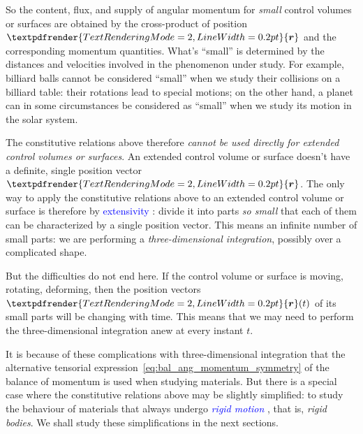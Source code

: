 \documentclass[a4paper,12pt,%
onecolumn,oneside,%
british%
]{memoir}
\renewcommand*{\bm}[1]{\textpdfrender{TextRenderingMode=2,LineWidth=0.2pt}{\boldsymbol{#1}}}
\renewcommand*{\|}[1][]{\nonscript\:#1\vert\nonscript\:\mathopen{}}
\newcommand*{\sect}{\S}%
\renewcommand*{\autoref}[3][\sect\,\ref]{\textcolor{blue}{#3}
\raisebox{0.6ex}{\color{blue}\miniscule%
\faIcon{angle-right}%
\;#1{#2}\;p.\,\pageref{#2}}}
\newcommand*{\yr}{\bm{r}}
\begin{document}
\medskip

So the content, flux, and supply of angular momentum for \emph{small} control volumes or surfaces are obtained by the cross-product of position $\yr$ and the corresponding momentum quantities. What's \enquote{small} is determined by the distances and velocities involved in the phenomenon under study. For example, billiard balls cannot be considered \enquote{small} when we study their collisions on a billiard table: their rotations lead to special motions; on the other hand, a planet can in some circumstances be considered as \enquote{small} when we study its motion in the solar system.

The constitutive relations above therefore \emph{cannot be used directly for extended control volumes or surfaces}. An extended control volume or surface doesn't have a definite, single position vector $\yr$. The only way to apply the constitutive relations above to an extended control volume or surface is therefore by \autoref{def:extensivity}{extensivity}: divide it into parts \emph{so small} that each of them can be characterized by a single position vector. This means an infinite number of small parts: we are performing a \emph{three-dimensional integration}, possibly over a complicated shape.

But the difficulties do not end here. If the control volume or surface is moving, rotating, deforming, then the position vectors $\yr(t)$ of its small parts will be changing with time. This means that we may need to perform the three-dimensional integration anew at every instant $t$.

It is because of these complications with three-dimensional integration that the alternative tensorial expression~\eqref{eq:bal_ang_momentum_symmetry} of the balance of momentum is used when studying materials. But there is a special case where the constitutive relations above may be slightly simplified: to study the behaviour of materials that always undergo \autoref{sec:rigid_bodies}{\emph{rigid motion}}, that is, \emph{rigid bodies}. We shall study these simplifications in the next sections.
\end{document}
